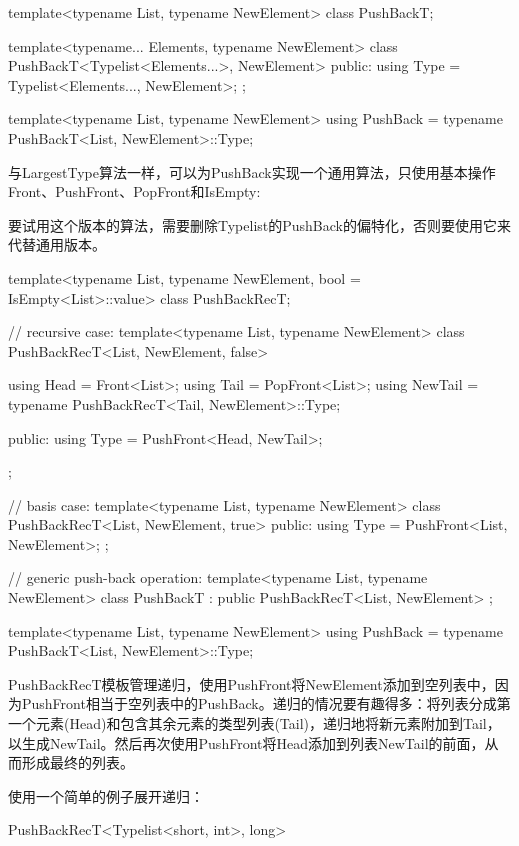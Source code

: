\begin{cpp}
template<typename List, typename NewElement>
class PushBackT;

template<typename... Elements, typename NewElement>
class PushBackT<Typelist<Elements...>, NewElement>
{
	public:
	using Type = Typelist<Elements..., NewElement>;
};

template<typename List, typename NewElement>
using PushBack = typename PushBackT<List, NewElement>::Type;
\end{cpp}

与LargestType算法一样，可以为PushBack实现一个通用算法，只使用基本操作Front、PushFront、PopFront和IsEmpty:

\begin{notice}
要试用这个版本的算法，需要删除Typelist的PushBack的偏特化，否则要使用它来代替通用版本。
\end{notice}

\begin{cpp}
template<typename List, typename NewElement, bool = IsEmpty<List>::value>
class PushBackRecT;

// recursive case:
template<typename List, typename NewElement>
class PushBackRecT<List, NewElement, false>
{
	using Head = Front<List>;
	using Tail = PopFront<List>;
	using NewTail = typename PushBackRecT<Tail, NewElement>::Type;
	
	public:
	using Type = PushFront<Head, NewTail>;
};

// basis case:
template<typename List, typename NewElement>
class PushBackRecT<List, NewElement, true>
{
	public:
	using Type = PushFront<List, NewElement>;
};

// generic push-back operation:
template<typename List, typename NewElement>
class PushBackT : public PushBackRecT<List, NewElement> { };

template<typename List, typename NewElement>
using PushBack = typename PushBackT<List, NewElement>::Type;
\end{cpp}

PushBackRecT模板管理递归，使用PushFront将NewElement添加到空列表中，因为PushFront相当于空列表中的PushBack。递归的情况要有趣得多：将列表分成第一个元素(Head)和包含其余元素的类型列表(Tail)，递归地将新元素附加到Tail，以生成NewTail。然后再次使用PushFront将Head添加到列表NewTail的前面，从而形成最终的列表。

使用一个简单的例子展开递归：

\begin{cpp}
PushBackRecT<Typelist<short, int>, long>
\end{cpp}

